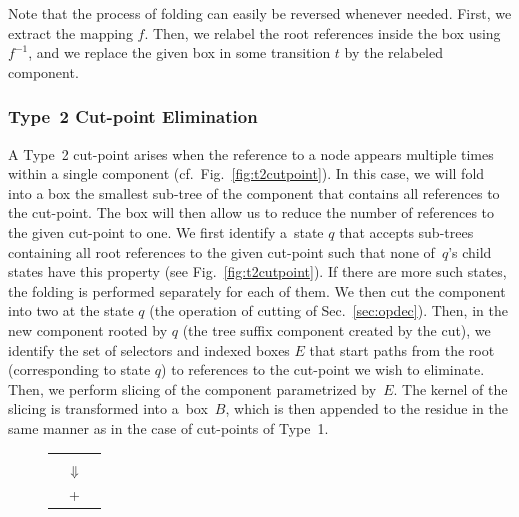 {%

Note that the process of folding can easily be reversed whenever needed. First, we
extract the mapping $f$. Then, we relabel the root references inside the box using
$f^{-1}$, and we replace the given box in some transition $t$ by the relabeled component.

\subsubsection*{Type~2 Cut-point Elimination}
A Type~2 cut-point arises when the reference to a node appears multiple
times within a single component (cf.\ Fig.~\ref{fig:t2cutpoint}). 
In this case, we will fold into a box the smallest sub-tree of the component that contains
all references to the cut-point.  The box will then allow us to reduce the number of
references to the given cut-point to one. We first identify a~state $q$ that accepts sub-trees
containing all root references to the given cut-point such that none of~$q$'s
child states have
this property (see Fig.~\ref{fig:t2cutpoint}). If there are more such states, the
folding is performed separately for each of them. 
%
We then cut the component into two at the state $q$ (the operation of cutting of Sec.~\ref{sec:opdec}).
%
Then, in the new component rooted by $q$ (the tree suffix component created by the cut), 
we identify the set of selectors and indexed boxes $E$ that start paths from the root (corresponding to state $q$) 
to references to the cut-point we wish to eliminate. Then, we perform slicing of the
component parametrized by~$E$. The kernel of the slicing is transformed into
a~box~$B$, which is then appended to the residue in the same manner as in the case of
cut-points of Type~1.

\begin{figure}[t]
  \centering
  \begin{tabular}{ccc}
    \multicolumn{3}{c}{\parbox{0.33\textwidth}{\centering}}\\
    \multicolumn{3}{c}{$\Downarrow$}\\
    \parbox{0.33\textwidth}{\centering} & + & \parbox{0.33\textwidth}{\centering}
  \end{tabular}


\end{figure}}
